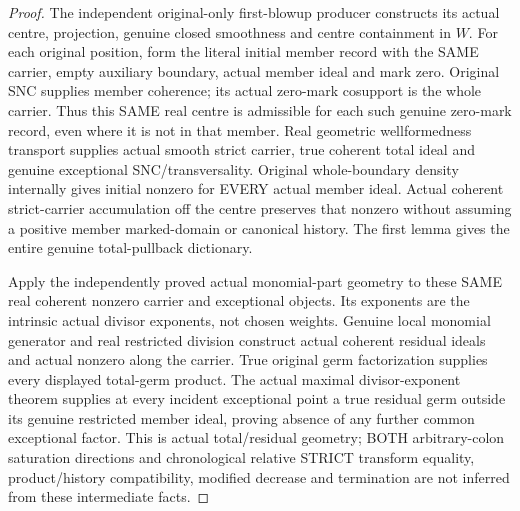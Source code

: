 \begin{proof}
The independent original-only first-blowup producer constructs its actual
centre, projection, genuine closed smoothness and centre containment in $W$.
For each original position, form the literal initial member record with the
SAME carrier, empty auxiliary boundary, actual member ideal and mark zero.
Original SNC supplies member coherence; its actual zero-mark cosupport is the
whole carrier. Thus this SAME real centre is admissible for each such genuine
zero-mark record, even where it is not in that member. Real geometric
wellformedness transport supplies actual smooth strict carrier, true coherent
total ideal and genuine exceptional SNC/transversality. Original whole-boundary
density internally gives initial nonzero for EVERY actual member ideal.
Actual coherent strict-carrier accumulation off the centre preserves that
nonzero without assuming a positive member marked-domain or canonical history.
The first lemma gives the entire genuine total-pullback dictionary.

Apply the independently proved actual monomial-part geometry to these SAME
real coherent nonzero carrier and exceptional objects. Its exponents are the
intrinsic actual divisor exponents, not chosen weights. Genuine local
monomial generator and real restricted division construct actual coherent
residual ideals and actual nonzero along the carrier. True original germ
factorization supplies every displayed total-germ product. The actual maximal
divisor-exponent theorem supplies at every incident exceptional point a true
residual germ outside its genuine restricted member ideal, proving absence of
any further common exceptional factor. This is actual total/residual geometry;
BOTH arbitrary-colon saturation directions and chronological relative STRICT
transform equality, product/history compatibility, modified decrease and
termination are not inferred from these intermediate facts.
\end{proof}
